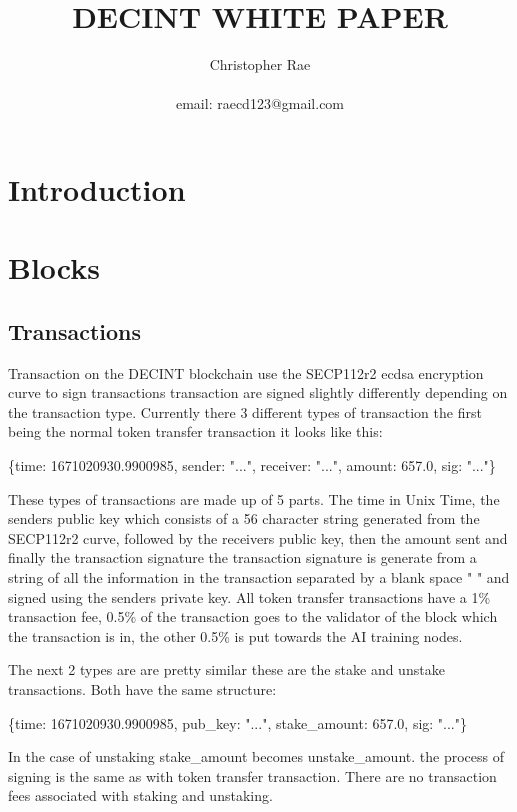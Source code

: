 \documentclass[11pt]{article}
\title{DECINT WHITE PAPER}
\author{Christopher Rae \\ \begin{small} email: raecd123@gmail.com \end{small}}
\date{}
\begin{document}
\maketitle

\tableofcontents
\newpage
\section{Introduction}

\section{Blocks} 
\subsection{Transactions}
Transaction on the DECINT blockchain use the SECP112r2 ecdsa encryption curve to sign transactions transaction are signed slightly differently depending on the transaction type. Currently there 3 different types of transaction the first being the normal token transfer transaction it looks like this:
\
\begin{center}
\{time: 1671020930.9900985,  sender: "...",  receiver: "...",  amount: 657.0,  sig: "..."\}
\end{center}

These types of transactions are made up of 5 parts. The time in Unix Time, the senders public key which consists of a 56 character string generated from the SECP112r2 curve, followed by the receivers public key, then the amount sent and finally the transaction signature the transaction signature is generate from a string of all the information in the transaction separated by a blank space " " and signed using the senders private key. All token transfer transactions have a 1\% transaction fee, 0.5\% of the transaction goes to the validator of the block which the transaction is in, the other 0.5\% is put towards the AI training nodes.  

The next 2 types are are pretty similar these are the stake and unstake transactions. Both have the same structure:

\begin{center}
\{time: 1671020930.9900985,  pub\_key: "...",  stake\_amount: 657.0,  sig: "..."\}
\end{center}

In the case of unstaking stake\_amount becomes unstake\_amount. the process of signing is the same as with token transfer transaction. There are no transaction fees associated with staking and unstaking.
\end{document}
